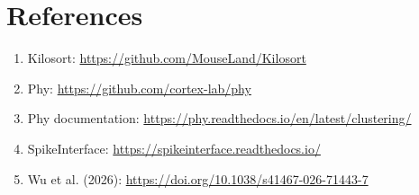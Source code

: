 \documentclass[11pt,a4paper]{article}
\begin{document}
\section{References}

\begin{enumerate}
    \item Kilosort: \url{https://github.com/MouseLand/Kilosort}
    \item Phy: \url{https://github.com/cortex-lab/phy}
    \item Phy documentation:
    \url{https://phy.readthedocs.io/en/latest/clustering/}
    \item SpikeInterface:
    \url{https://spikeinterface.readthedocs.io/}
    \item Wu et al. (2026):
    \url{https://doi.org/10.1038/s41467-026-71443-7}
\end{enumerate}
\end{document}
